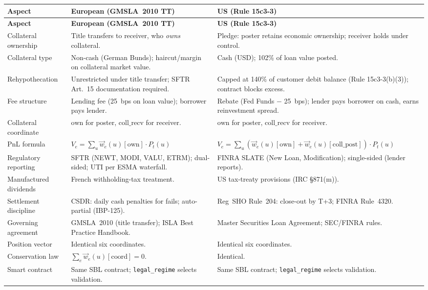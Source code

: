 \begin{center}\small
\begin{longtable}{p{3.2cm} p{5.2cm} p{5.2cm}}
\toprule
\textbf{Aspect} & \textbf{European (GMSLA~2010 TT)} & \textbf{US (Rule 15c3-3)} \\
\midrule
\endfirsthead
\toprule
\textbf{Aspect} & \textbf{European (GMSLA~2010 TT)} & \textbf{US (Rule 15c3-3)} \\
\midrule
\endhead
\bottomrule
\endfoot
Collateral ownership & Title transfers to receiver, who \emph{owns} collateral. & Pledge: poster retains economic ownership; receiver holds under control. \\
\midrule
Collateral type & Non-cash (German Bunds); haircut/margin on collateral market value. & Cash (USD); 102\% of loan value posted. \\
\midrule
Rehypothecation & Unrestricted under title transfer; SFTR Art.~15 documentation required. & Capped at 140\% of customer debit balance (Rule 15c3-3(b)(3)); contract blocks excess. \\
\midrule
Fee structure & Lending fee (25~bps on loan value); borrower pays lender. & Rebate (Fed Funds $-$ 25~bps); lender pays borrower on cash, earns reinvestment spread. \\
\midrule
Collateral coordinate & $\mathrm{own}$ for poster, $\mathrm{coll\_recv}$ for receiver. & $\mathrm{own}$ for poster, $\mathrm{coll\_recv}$ for receiver. \\
\midrule
PnL formula & $V_e = \sum_u \vec{w}_e(u)[\mathrm{own}] \cdot P_t(u)$ & $V_e = \sum_u (\vec{w}_e(u)[\mathrm{own}] + \vec{w}_e(u)[\mathrm{coll\_post}]) \cdot P_t(u)$ \\
\midrule
Regulatory reporting & SFTR (NEWT, MODI, VALU, ETRM); dual-sided; UTI per ESMA waterfall. & FINRA SLATE (New Loan, Modification); single-sided (lender reports). \\
\midrule
Manufactured dividends & French withholding-tax treatment. & US tax-treaty provisions (IRC \S871(m)). \\
\midrule
Settlement discipline & CSDR: daily cash penalties for fails; auto-partial (IBP-125). & Reg~SHO Rule~204: close-out by T+3; FINRA Rule~4320. \\
\midrule
Governing agreement & GMSLA~2010 (title transfer); ISLA Best Practice Handbook. & Master Securities Loan Agreement; SEC/FINRA rules. \\
\midrule
Position vector & Identical six coordinates. & Identical six coordinates. \\
\midrule
Conservation law & $\sum_e \vec{w}_e(u)[\text{coord}] = 0$. & Identical. \\
\midrule
Smart contract & Same SBL contract; \texttt{legal\_regime} selects validation. & Same SBL contract; \texttt{legal\_regime} selects validation. \\
\bottomrule
\end{longtable}
\end{center}

